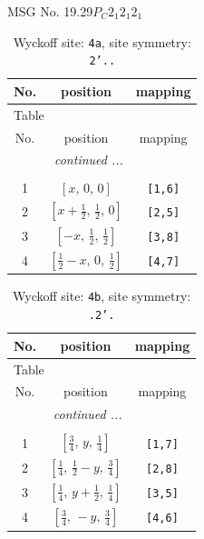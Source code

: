 \documentclass[fleqn,8pt]{jsarticle}
\begin{document}
\setcounter{MaxMatrixCols}{32}

\renewcommand{\tablename}{Table~}
\renewcommand{\figurename}{Figure~}
\begin{center}
\LARGE
MSG No. 19.29\quad$P_{C}2_{1}2_{1}2_{1}$
\end{center}
\renewcommand{\arraystretch}{1.2}
\begin{longtable}{ccc}
\caption{Wyckoff site: {\tt 4a}, site symmetry: {\tt 2'..}}
 \\
 \hline \hline
No. & position & mapping \\ \hline \endfirsthead

\multicolumn{2}{l}{\tablename\ \thetable{}} \\
 \hline \hline
No. & position & mapping \\ \hline \endhead

 \hline \hline
\multicolumn{2}{r}{\footnotesize\it continued ...} \\ \endfoot

 \hline \hline
\multicolumn{2}{r}{} \\ \endlastfoot

1 & $\left[ x,\, 0,\, 0 \right]$ & {\tt [1,6]} \\ \hline
2 & $\left[ x + \frac{1}{2},\, \frac{1}{2},\, 0 \right]$ & {\tt [2,5]} \\ \hline
3 & $\left[ - x,\, \frac{1}{2},\, \frac{1}{2} \right]$ & {\tt [3,8]} \\ \hline
4 & $\left[ \frac{1}{2} - x,\, 0,\, \frac{1}{2} \right]$ & {\tt [4,7]} \\
\end{longtable}
\renewcommand{\arraystretch}{1.2}
\begin{longtable}{ccc}
\caption{Wyckoff site: {\tt 4b}, site symmetry: {\tt .2'.}}
 \\
 \hline \hline
No. & position & mapping \\ \hline \endfirsthead

\multicolumn{2}{l}{\tablename\ \thetable{}} \\
 \hline \hline
No. & position & mapping \\ \hline \endhead

 \hline \hline
\multicolumn{2}{r}{\footnotesize\it continued ...} \\ \endfoot

 \hline \hline
\multicolumn{2}{r}{} \\ \endlastfoot

1 & $\left[ \frac{3}{4},\, y,\, \frac{1}{4} \right]$ & {\tt [1,7]} \\ \hline
2 & $\left[ \frac{1}{4},\, \frac{1}{2} - y,\, \frac{3}{4} \right]$ & {\tt [2,8]} \\ \hline
3 & $\left[ \frac{1}{4},\, y + \frac{1}{2},\, \frac{1}{4} \right]$ & {\tt [3,5]} \\ \hline
4 & $\left[ \frac{3}{4},\, - y,\, \frac{3}{4} \right]$ & {\tt [4,6]} \\
\end{longtable}
\end{document}
